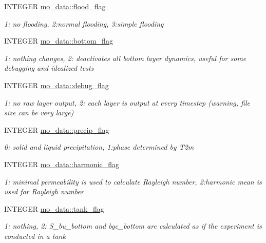 \begin{DoxyCompactItemize}
INTEGER \hyperlink{namespacemo__data_a7e6cb2f19ab88a5903aa5574e5ec6b19}{mo\_\-data::flood\_\-flag}
\begin{DoxyCompactList}\small\item\em 1: no flooding, 2:normal flooding, 3:simple flooding \item\end{DoxyCompactList}\item 
INTEGER \hyperlink{namespacemo__data_ab9e96b3fd1d356487e156f8634c09732}{mo\_\-data::bottom\_\-flag}
\begin{DoxyCompactList}\small\item\em 1: nothing changes, 2: deactivates all bottom layer dynamics, useful for some debugging and idealized tests \item\end{DoxyCompactList}\item 
INTEGER \hyperlink{namespacemo__data_a014d834dc753f1d37c0575dc9037878a}{mo\_\-data::debug\_\-flag}
\begin{DoxyCompactList}\small\item\em 1: no raw layer output, 2: each layer is output at every timestep (warning, file size can be very large) \item\end{DoxyCompactList}\item 
INTEGER \hyperlink{namespacemo__data_a466c2f829a8b266724dd9150cb99d42f}{mo\_\-data::precip\_\-flag}
\begin{DoxyCompactList}\small\item\em 0: solid and liquid precipitation, 1:phase determined by T2m \item\end{DoxyCompactList}\item 
INTEGER \hyperlink{namespacemo__data_a95ab71baf4d9fbae790e31780317af06}{mo\_\-data::harmonic\_\-flag}
\begin{DoxyCompactList}\small\item\em 1: minimal permeability is used to calculate Rayleigh number, 2:harmonic mean is used for Rayleigh number \item\end{DoxyCompactList}\item 
INTEGER \hyperlink{namespacemo__data_a20840603c089c697b8662ca2c45f23f3}{mo\_\-data::tank\_\-flag}
\begin{DoxyCompactList}\small\item\em 1: nothing, 2: S\_\-bu\_\-bottom and bgc\_\-bottom are calculated as if the experiment is conducted in a tank \item\end{DoxyCompactList}\item 

\end{DoxyCompactItemize}
